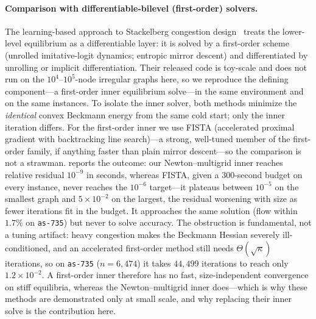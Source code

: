 \documentclass[ijoc]{informs3}
\begin{document}
\paragraph{Comparison with differentiable-bilevel (first-order) solvers.}
The learning-based approach to Stackelberg congestion design~\citep{li2022,goyal2023} treats the lower-level
equilibrium as a differentiable layer: it is solved by a first-order scheme (unrolled imitative-logit dynamics;
entropic mirror descent) and differentiated by unrolling or implicit differentiation. Their released code is
toy-scale and does not run on the $10^4$--$10^5$-node irregular graphs here, so we reproduce the defining
component---a first-order inner equilibrium solve---in the same environment and on the same instances. To
isolate the inner solver, both methods minimize the \emph{identical} convex Beckmann energy from the same cold
start; only the inner iteration differs. For the first-order inner we use FISTA (accelerated proximal gradient
with backtracking line search)---a strong, well-tuned member of the first-order family, if anything faster than
plain mirror descent---so the comparison is not a strawman.  reports the outcome: our
Newton--multigrid inner reaches relative residual $10^{-9}$ in seconds, whereas FISTA, given a $300$-second
budget on every instance, never reaches the $10^{-6}$ target---it plateaus between $10^{-5}$ on the smallest
graph and $5\times10^{-2}$ on the largest, the residual worsening with size as fewer iterations fit in the
budget. It approaches the same solution (flow within $1.7\%$ on \texttt{as-735}) but never to solve accuracy.
The obstruction is fundamental, not a tuning artifact: heavy congestion makes the
Beckmann Hessian severely ill-conditioned, and an accelerated first-order method still needs
$\Theta(\sqrt{\kappa})$ iterations, so on \texttt{as-735} ($n=6{,}474$) it takes $44{,}499$ iterations to reach
only $1.2\times10^{-2}$. A first-order inner therefore has no fast, size-independent convergence on stiff
equilibria, whereas the Newton--multigrid inner does---which is why these methods are demonstrated only at small
scale, and why replacing their inner solve is the contribution here.
\end{document}
